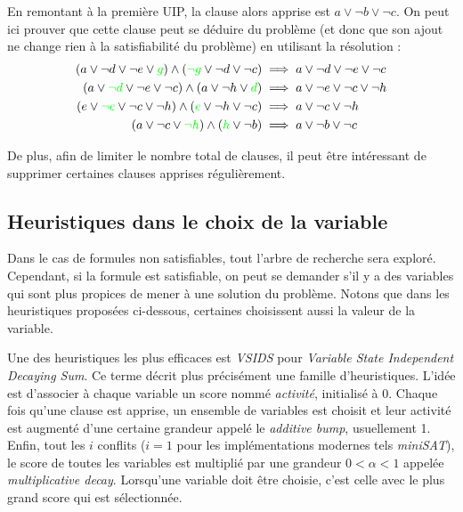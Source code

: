 En remontant à la première UIP, la clause alors apprise est
$a\vee\neg b\vee\neg c$. On peut ici prouver que cette clause peut se déduire
du problème (et donc que son ajout ne change rien à la satisfiabilité du
problème) en utilisant la résolution :
\begin{align*}
    (a\vee\neg d\vee\neg e\vee {\color{green}g})
    \wedge({\color{green}\neg g}\vee\neg d\vee\neg c)
        &\implies a\vee\neg d\vee\neg e\vee\neg c \\
    (a\vee{\color{green}\neg d}\vee\neg e\vee\neg c)
    \wedge(a\vee\neg h\vee{\color{green} d})
        &\implies a\vee\neg e\vee\neg c\vee\neg h \\
    (e\vee{\color{green}\neg e}\vee\neg c\vee\neg h)
    \wedge({\color{green}e}\vee\neg h\vee\neg c)
        &\implies a\vee\neg c\vee\neg h \\
    (a\vee\neg c\vee{\color{green}\neg h})\wedge({\color{green} h}\vee\neg b)
        &\implies a\vee\neg b\vee\neg c\\
\end{align*}

De plus, afin de limiter le nombre total de clauses, il peut être intéressant
de supprimer certaines clauses apprises régulièrement.

\subsection{Heuristiques dans le choix de la variable}\label{decision}
Dans le cas de formules non satisfiables, tout l'arbre de recherche sera
exploré. Cependant, si la formule est satisfiable, on peut se demander s'il
y a des variables qui sont plus propices de mener à une solution du problème.
Notons que dans les heuristiques proposées ci-dessous, certaines choisissent
aussi la valeur de la variable.

Une des heuristiques les plus efficaces est \emph{VSIDS} pour \emph{Variable
State Independent Decaying Sum}. Ce terme décrit plus précisément une famille
d'heuristiques. L'idée est d'associer à chaque variable un score nommé
\emph{activité}, initialisé à $0$. Chaque fois qu'une clause est apprise,
un ensemble de variables est choisit et leur activité est augmenté d'une
certaine grandeur appelé le \emph{additive bump}, usuellement 1. Enfin, tout
les $i$ conflits ($i=1$ pour les implémentations modernes tels \emph{miniSAT}),
le score de toutes les variables est multiplié par une grandeur
$0 < \alpha < 1$ appelée \emph{multiplicative decay}. Lorsqu'une variable doit
être choisie, c'est celle avec le plus grand score qui est sélectionnée.

